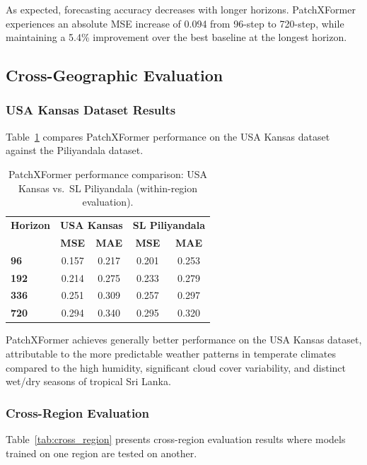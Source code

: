\documentclass[a4paper,fleqn]{cas-dc}
\begin{document}
As expected, forecasting accuracy decreases with longer horizons. PatchXFormer experiences an absolute MSE increase of 0.094 from 96-step to 720-step, while maintaining a 5.4\% improvement over the best baseline at the longest horizon.

\subsection{Cross-Geographic Evaluation}

\subsubsection{USA Kansas Dataset Results}

Table~\ref{tab:us_results} compares PatchXFormer performance on the USA Kansas dataset against the Piliyandala dataset.

\begin{table}[width=.9\linewidth,pos=h]
\caption{PatchXFormer performance comparison: USA Kansas vs.\ SL Piliyandala (within-region evaluation).}\label{tab:us_results}
\begin{tabular*}{\tblwidth}{@{} lcccc@{} }
\toprule
\textbf{Horizon} & \multicolumn{2}{c}{\textbf{USA Kansas}} & \multicolumn{2}{c}{\textbf{SL Piliyandala}} \\
 & \textbf{MSE} & \textbf{MAE} & \textbf{MSE} & \textbf{MAE} \\
\midrule
\textbf{96}  & 0.157 & 0.217 & 0.201 & 0.253\\
\textbf{192} & 0.214 & 0.275 & 0.233 & 0.279\\
\textbf{336} & 0.251 & 0.309 & 0.257 & 0.297\\
\textbf{720} & 0.294 & 0.340 & 0.295 & 0.320\\
\bottomrule
\end{tabular*}
\end{table}

PatchXFormer achieves generally better performance on the USA Kansas dataset, attributable to the more predictable weather patterns in temperate climates compared to the high humidity, significant cloud cover variability, and distinct wet/dry seasons of tropical Sri Lanka.

\subsubsection{Cross-Region Evaluation}

Table~\ref{tab:cross_region} presents cross-region evaluation results where models trained on one region are tested on another.
\end{document}

